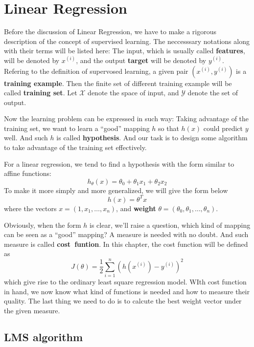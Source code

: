 \chapter{Linear Regression}

Before the discussion of Linear Regression, we have to make a rigorous description of the concept of supervised learning. The neccesssary notations along with their terms will be listed here:
The input, which is usually called \textbf{features}, will be denoted by $x^{(i)}$, and the output \textbf{target} will be denoted by $y^{(i)}$. Refering to the definition of supervosed learning,
a given pair $(x^{(i)},y^{(i)})$ is a \textbf{training example}. Then the finite set of different training example will be called \textbf{training set}. Let $\mathcal{X}$ denote the space of input,
and $\mathcal{Y}$ denote the set of output. 

Now the learning problem can be expressed in such way: Taking advantage of the training set, we want to learn a ``good'' mapping $h$ so that $h(x)$ could predict $y$ well. And such $h$ is called
\textbf{hypothesis}. And our task is to design some algorithm to take advantage of the training set effectively. 

For a linear regression, we tend to find a hypothesis with the form similar to affine functions:
\[h_\theta(x) = \theta_0+\theta_1x_1+\theta_2x_2\]
To make it more simply and more generalized, we will give the form below
\[h(x)=\theta^Tx\]
where the vectors $x = (1,x_1,\ldots,x_n)$, and \textbf{weight} $\theta = (\theta_0, \theta_1,\ldots, \theta_n)$.

Obviously, when the form $h$ is clear, we'll raise a question, which kind of mapping can be seen as a ``good'' mapping? A measure is needed with no doubt. And such measure is called \textbf{cost~funtion}.
In this chapter, the cost function will be defined as 
\[J(\theta)=\frac{1}{2}\sum_{i=1}^{n}(h(x^{(i)})-y^{(i)})^2\]
which give rise to the ordinary least square regression model. WIth cost function in hand, we now know what kind of functions is needed and how to measure their quality. The last thing we need to do is
to calcute the best weight vector under the given measure. 

\section{LMS algorithm}

